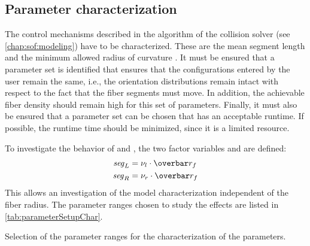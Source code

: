 \subsection{Parameter characterization}\label{sec:modelSetup}
%
The control mechanisms described in the algorithm of the collision solver  (see \cref{chap:sof:modeling}) have to be characterized.
These are the mean segment length \segLength{} and the minimum allowed radius of curvature \segRadius{}.
It must be ensured that a parameter set is identified that ensures that the configurations entered by the user remain the same, i.e., the orientation distributions remain intact with respect to the fact that the fiber segments must move.
In addition, the achievable fiber density should remain high for this set of parameters.
Finally, it must also be ensured that a parameter set can be chosen that has an acceptable runtime.
If possible, the runtime time should be minimized, since it is a limited resource.
\par
%
To investigate the behavior of \segLength{} and \segRadius{}, the two factor variables \segLengthFactor{} and \segRadiusFactor{} are defined:
\begin{align}
    \begin{split}
        \segLength &= \segLengthFactor \cdot \fiberRadiusMean\\
        \segRadius &= \segRadiusFactor \cdot \fiberRadiusMean
    \end{split}
\end{align}
This allows an investigation of the model characterization independent of the fiber radius.
The parameter ranges chosen to study the effects are listed in \cref{tab:parameterSetupChar}.
%
\begin{table}[!b]
%
\centering
{}
\caption{Selection of the parameter ranges for the characterization of the parameters.}
\label{tab:parameterSetupChar}
\end{table}
